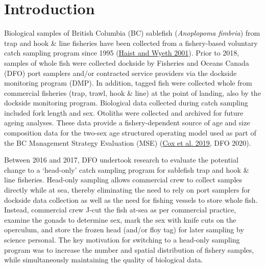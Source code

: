 \documentclass[12pt]{article}\usepackage[]{graphicx}\usepackage[]{color}
\begin{document}

\frontmatter


\renewcommand{\headrulewidth}{0.5pt}  %
\renewcommand{\footrulewidth}{0.5pt}  %

\newcommand{\lt}{\ensuremath <}
\newcommand{\gt}{\ensuremath >}

\newlength{\cslhangindent}
\setlength{\cslhangindent}{1.5em}
\newenvironment{cslreferences}%
  {}%
  {\par}

\hypertarget{introduction}{%
\section{Introduction}\label{introduction}}

Biological samples of British Columbia (BC) sablefish (\emph{Anoplopoma fimbria}) from trap and hook \& line fisheries have been collected from a fishery-based voluntary catch sampling program since 1995 (\protect\hyperlink{ref-Haist2001}{Haist and Wyeth 2001}). Prior to 2018, samples of whole fish were collected dockside by Fisheries and Oceans Canada (DFO) port samplers and/or contracted service providers via the dockside monitoring program (DMP). In addition, tagged fish were collected whole from commercial fisheries (trap, trawl, hook \& line) at the point of landing, also by the dockside monitoring program. Biological data collected during catch sampling included fork length and sex. Otoliths were collected and archived for future ageing analyses. These data provide a fishery-dependent source of age and size composition data for the two-sex age structured operating model used as part of the BC Management Strategy Evaluation (MSE) (\protect\hyperlink{ref-Cox2019}{Cox et al. 2019}, DFO 2020).

Between 2016 and 2017, DFO undertook research to evaluate the potential change to a `head-only' catch sampling program for sablefish trap and hook \& line fisheries. Head-only sampling allows commercial crew to collect samples directly while at sea, thereby eliminating the need to rely on port samplers for dockside data collection as well as the need for fishing vessels to store whole fish. Instead, commercial crew J-cut the fish at-sea as per commercial practice, examine the gonads to determine sex, mark the sex with knife cuts on the operculum, and store the frozen head (and/or floy tag) for later sampling by science personal. The key motivation for switching to a head-only sampling program was to increase the number and spatial distribution of fishery samples, while simultaneously maintaining the quality of biological data.
\end{document}
